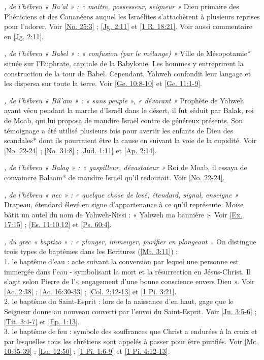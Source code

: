 \begin{multicols}{2}
\textit{, de l'hébreu « Ba'al » : « maître, possesseur, seigneur »}\newline
Dieu primaire des Phéniciens et des Cananéens auquel les Israélites s'attachèrent à plusieurs reprises pour l'adorer. Voir \vref{No. 25:3} ; \vref{Jg. 2:11} et \vref{1 R. 18:21}. Voir aussi commentaire en \vref{Jg. 2:11}.

\textit{, de l'hébreu « Babel » : « confusion (par le mélange) »}\newline
Ville de Mésopotamie* située sur l'Euphrate, capitale de la Babylonie. Les hommes y entreprirent la construction de la tour de Babel. Cependant, Yahweh confondit leur langage et les dispersa sur toute la terre. Voir \vref{Ge. 10:8-10} et \vref{Ge. 11:1-9}.

\textit{, de l'hébreu « Bil'am » : « sans peuple », « dévorant »}\newline
Prophète de Yahweh ayant vécu pendant la marche d'Israël dans le désert, il fut séduit par Balak, roi de Moab, qui lui proposa de maudire Israël contre de généreux présents. Son témoignage a été utilisé plusieurs fois pour avertir les enfants de Dieu des scandales* dont ils pourraient être la cause en suivant la voie de la cupidité. Voir \vref{No. 22-24} ; \vref{No. 31:8} ; \vref{Jud. 1:11} et \vref{Ap. 2:14}.

\textit{, de l'hébreu « Balaq » : « gaspilleur, dévastateur »}\newline
Roi de Moab, il essaya de convaincre Balaam* de maudire Israël qu'il redoutait. Voir \vref{No. 22-24}.

\textit{, de l'hébreu « nec » : « quelque chose de levé, étendard, signal, enseigne »}\newline
Drapeau, étendard élevé en signe d'appartenance à ce qu'il représente. Moïse bâtit un autel du nom de Yahweh-Nissi : « Yahweh ma bannière ». Voir \vref{Ex. 17:15} ; \vref{Es. 11:10,12} et \vref{Ps. 60:4}.

\textit{, du grec « baptizo » : « plonger, immerger, purifier en plongeant »}\newline
On distingue trois types de baptêmes dans les Ecritures (\vref{Mt. 3:11}) :
\\1. le baptême d'eau : acte suivant la conversion par lequel une personne est immergée dans l'eau - symbolisant la mort et la résurrection en Jésus-Christ. Il s'agit selon Pierre de l'« engagement d'une bonne conscience envers Dieu ». Voir \vref{Ac. 2:38} ; \vref{Ac. 16:30-33} ; \vref{Col. 2:12-13} et \vref{1 Pi. 3:21}.
\\2. le baptême du Saint-Esprit : lors de la naissance d'en haut, gage que le Seigneur donne au nouveau converti par l'envoi du Saint-Esprit. Voir \vref{Jn. 3:5-6} ; \vref{Tit. 3:4-7} et \vref{Ep. 1:13}.
\\3. le baptême de feu : symbole des souffrances que Christ a endurées à la croix et par lesquelles tous les chrétiens sont appelés à passer pour être purifiés. Voir \vref{Mc. 10:35-39} ; \vref{Lu. 12:50} ; \vref{1 Pi. 1:6-9} et \vref{1 Pi. 4:12-13}.


\end{multicols}
